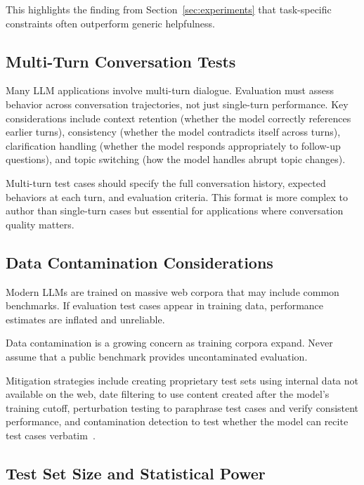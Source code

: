 This highlights the finding from Section~\ref{sec:experiments} that task-specific constraints often outperform generic helpfulness.

\subsection{Multi-Turn Conversation Tests}

Many LLM applications involve multi-turn dialogue. Evaluation must assess behavior across conversation trajectories, not just single-turn performance. Key considerations include context retention (whether the model correctly references earlier turns), consistency (whether the model contradicts itself across turns), clarification handling (whether the model responds appropriately to follow-up questions), and topic switching (how the model handles abrupt topic changes).

Multi-turn test cases should specify the full conversation history, expected behaviors at each turn, and evaluation criteria. This format is more complex to author than single-turn cases but essential for applications where conversation quality matters.

\subsection{Data Contamination Considerations}

Modern LLMs are trained on massive web corpora that may include common benchmarks. If evaluation test cases appear in training data, performance estimates are inflated and unreliable.

\begin{warningbox}
Data contamination is a growing concern as training corpora expand. Never assume that a public benchmark provides uncontaminated evaluation.
\end{warningbox}

Mitigation strategies include creating proprietary test sets using internal data not available on the web, date filtering to use content created after the model's training cutoff, perturbation testing to paraphrase test cases and verify consistent performance, and contamination detection to test whether the model can recite test cases verbatim~\citep{sainz2023nlp, jacovi2023stop}.

\subsection{Test Set Size and Statistical Power}

